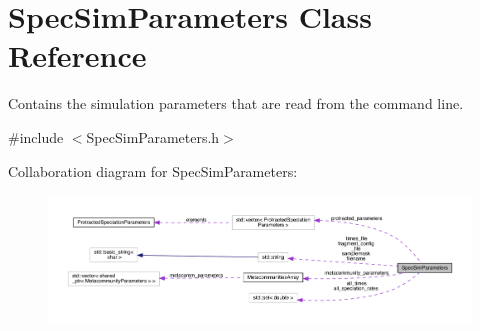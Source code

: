 \hypertarget{struct_spec_sim_parameters}{}\section{Spec\+Sim\+Parameters Class Reference}
\label{struct_spec_sim_parameters}


Contains the simulation parameters that are read from the command line.  




{\ttfamily \#include $<$Spec\+Sim\+Parameters.\+h$>$}



Collaboration diagram for Spec\+Sim\+Parameters\+:
\nopagebreak
\begin{figure}[H]
\begin{center}
\leavevmode
\includegraphics[width=350pt]{struct_spec_sim_parameters__coll__graph}
\end{center}
\end{figure}
